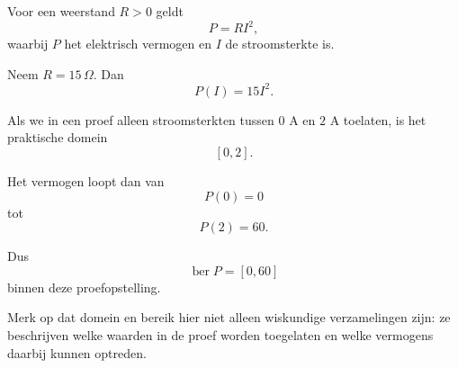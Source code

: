 \documentclass{ximera}
\begin{document}


\begin{voorbeeld}

Voor een weerstand \(R>0\) geldt
\[
P=RI^2,
\]
waarbij \(P\) het elektrisch vermogen en \(I\) de stroomsterkte is.

Neem \(R=15\,\Omega\). Dan
\[
P(I)=15I^2.
\]

Als we in een proef alleen stroomsterkten tussen \(0\) A en \(2\) A toelaten,
is het praktische domein
\[
[0,2].
\]

Het vermogen loopt dan van
\[
P(0)=0
\]
tot
\[
P(2)=60.
\]

Dus
\[
\operatorname{ber}P=[0,60]
\]
binnen deze proefopstelling.

\begin{center}
\end{center}

Merk op dat domein en bereik hier niet alleen wiskundige verzamelingen zijn:
ze beschrijven welke waarden in de proef worden toegelaten en welke
vermogens daarbij kunnen optreden.
\end{voorbeeld}
\end{document}
